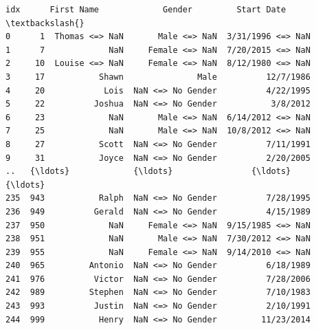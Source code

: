\documentclass [oneside,10pt,a4paper,ngerman,BCOR10mm,headsepline,parindent,final]{scrartcl}
\makeatletter
\newcommand{\boxspacing}{\kern\kvtcb@left@rule\kern\kvtcb@boxsep}
\newcommand{\prompt}[4]{
        {\ttfamily\llap{{\color{#2}[#3]:\hspace{3pt}#4}}\vspace{-\baselineskip}}
    }
\makeatother
\begin{document}
            \begin{tcolorbox}[breakable, size=fbox, boxrule=.5pt, pad at break*=1mm, opacityfill=0]
\prompt{Out}{outcolor}{50}{\boxspacing}
\begin{Verbatim}[commandchars=\\\{\}]
     idx      First Name             Gender         Start Date  \textbackslash{}
0      1  Thomas <=> NaN       Male <=> NaN  3/31/1996 <=> NaN
1      7             NaN     Female <=> NaN  7/20/2015 <=> NaN
2     10  Louise <=> NaN     Female <=> NaN  8/12/1980 <=> NaN
3     17           Shawn               Male          12/7/1986
4     20            Lois  NaN <=> No Gender          4/22/1995
5     22          Joshua  NaN <=> No Gender           3/8/2012
6     23             NaN       Male <=> NaN  6/14/2012 <=> NaN
7     25             NaN       Male <=> NaN  10/8/2012 <=> NaN
8     27           Scott  NaN <=> No Gender          7/11/1991
9     31           Joyce  NaN <=> No Gender          2/20/2005
..   {\ldots}             {\ldots}                {\ldots}                {\ldots}
235  943           Ralph  NaN <=> No Gender          7/28/1995
236  949          Gerald  NaN <=> No Gender          4/15/1989
237  950             NaN     Female <=> NaN  9/15/1985 <=> NaN
238  951             NaN       Male <=> NaN  7/30/2012 <=> NaN
239  955             NaN     Female <=> NaN  9/14/2010 <=> NaN
240  965         Antonio  NaN <=> No Gender          6/18/1989
241  976          Victor  NaN <=> No Gender          7/28/2006
242  989         Stephen  NaN <=> No Gender          7/10/1983
243  993          Justin  NaN <=> No Gender          2/10/1991
244  999           Henry  NaN <=> No Gender         11/23/2014


\end{Verbatim}
\end{tcolorbox}
\end{document}
